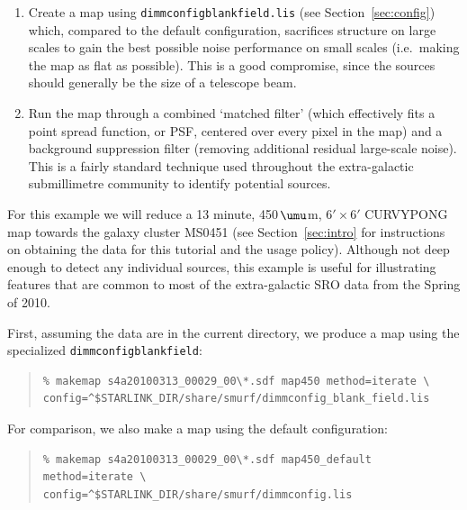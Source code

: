 \documentclass[twoside,11pt]{article}
\newcommand{\micron}{\mbox{\,${\umu}$m}}            %
\renewcommand{\_}{\texttt{\symbol{95}}}
\newenvironment{myquote}{\begin{quote}\begin{small}}{\end{small}\end{quote}}
\begin{document}
\begin{enumerate}

\item Create a map using \texttt{dimmconfig\_blank\_field.lis} (see
  Section~\ref{sec:config}) which, compared to the default
  configuration, sacrifices structure on large scales to gain the best
  possible noise performance on small scales (i.e.~making the map as
  flat as possible). This is a good compromise, since the sources
  should generally be the size of a telescope beam.

\item Run the map through a combined `matched filter' (which
  effectively fits a point spread function, or PSF, centered over
  every pixel in the map) and a background suppression filter
  (removing additional residual large-scale noise). This is a fairly
  standard technique used throughout the extra-galactic submillimetre
  community to identify potential sources.

\end{enumerate}

For this example we will reduce a 13 minute, 450\micron, $6' \times
6'$ CURVY\_PONG map towards the galaxy cluster MS0451 (see
Section~\ref{sec:intro} for instructions on obtaining the data for
this tutorial and the usage policy). Although not deep enough to
detect any individual sources, this example is useful for illustrating
features that are common to most of the extra-galactic SRO data from
the Spring of 2010.

First, assuming the data are in the current directory, we produce a
map using the specialized \texttt{dimmconfig\_blank\_field}:

\begin{myquote}
\begin{verbatim}
% makemap s4a20100313_00029_00\*.sdf map450 method=iterate \
config=^$STARLINK_DIR/share/smurf/dimmconfig_blank_field.lis
\end{verbatim}
\end{myquote}

For comparison, we also make a map using the default configuration:

\begin{myquote}
\begin{verbatim}
% makemap s4a20100313_00029_00\*.sdf map450_default method=iterate \
config=^$STARLINK_DIR/share/smurf/dimmconfig.lis
\end{verbatim}
\end{myquote}
\end{document}
